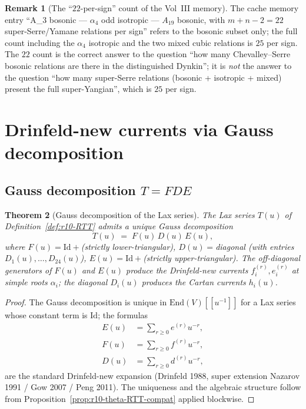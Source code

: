 \documentclass{article}
\providecommand{\End}{\mathrm{End}}
\providecommand{\Id}{\mathrm{Id}}
\newtheorem{theorem}{Theorem}
\theoremstyle{definition}
\newtheorem{remark}[theorem]{Remark}
\begin{document}
\begin{remark}[The ``$22$-per-sign'' count of the Vol~III memory]
\label{rem:r10-count-22}
The cache memory entry ``A_3 bosonic — $\alpha_4$ odd isotropic —
$A_{19}$ bosonic, with $m + n - 2 = 22$ super-Serre/Yamane relations
per sign'' refers to the bosonic subset only; the full count
including the $\alpha_4$ isotropic and the two mixed cubic relations
is $25$ per sign. The $22$ count is the correct answer to the
question ``how many Chevalley--Serre bosonic relations are there in
the distinguished Dynkin''; it is \emph{not} the answer to the
question ``how many super-Serre relations (bosonic + isotropic +
mixed) present the full super-Yangian'', which is $25$ per sign.
\end{remark}

\section{Drinfeld-new currents via Gauss decomposition}
\label{sec:r10-Drinfeld-new}

\subsection{Gauss decomposition $T = F D E$}

\begin{theorem}[Gauss decomposition of the Lax series]
\label{thm:r10-Gauss-dec}
The Lax series $T(u)$ of Definition~\ref{def:r10-RTT} admits a unique
Gauss decomposition
\begin{equation}\label{eq:r10-Gauss}
  T(u)
  \;=\;
  F(u)\, D(u)\, E(u),
\end{equation}
where $F(u) = \Id + $(strictly lower-triangular), $D(u) = $diagonal
(with entries $D_1(u), \ldots, D_{24}(u)$), $E(u) = \Id +
$(strictly upper-triangular). The off-diagonal generators of $F(u)$
and $E(u)$ produce the \emph{Drinfeld-new currents}
$f^{(r)}_i, e^{(r)}_i$ at simple roots $\alpha_i$; the diagonal
$D_i(u)$ produces the Cartan currents $h_i(u)$.
\end{theorem}

\begin{proof}
The Gauss decomposition is unique in $\End(V)[[u^{-1}]]$ for a Lax
series whose constant term is $\Id$; the formulas
\begin{align}
  E(u) &= \sum_{r \geq 0} e^{(r)} u^{-r}, \\
  F(u) &= \sum_{r \geq 0} f^{(r)} u^{-r}, \\
  D(u) &= \sum_{r \geq 0} d^{(r)} u^{-r},
\end{align}
are the standard Drinfeld-new expansion (Drinfeld 1988, super
extension Nazarov 1991 / Gow 2007 / Peng 2011). The uniqueness and
the algebraic structure follow from
Proposition~\ref{prop:r10-theta-RTT-compat} applied blockwise.
\end{proof}
\end{document}

